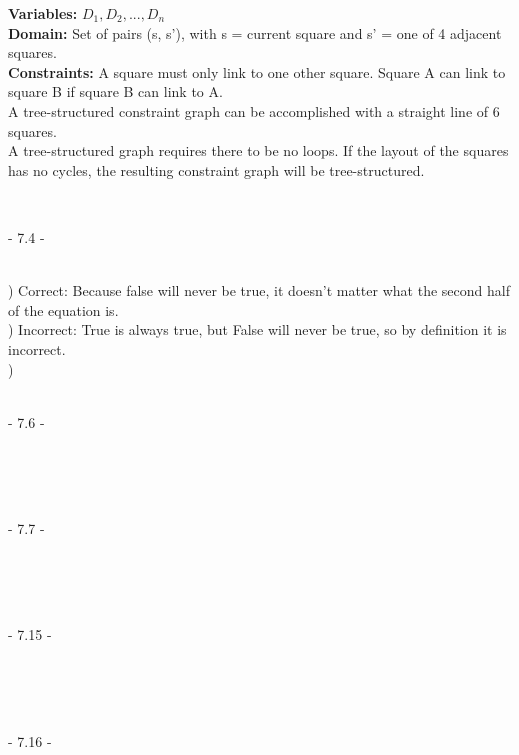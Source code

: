 \documentclass[12pt]{article}
\begin{document}
\noindent \textbf{Variables:} $D_1, D_2, ..., D_n$\\
\textbf{Domain:} Set of pairs (s, s'), with s = current square and s' = one of 4 adjacent squares.\\
\textbf{Constraints:} A square must only link to one other square. Square A can link to square B if square B can link to A. \\

A tree-structured constraint graph can be accomplished with a straight line of 6 squares.\\

A tree-structured graph requires there to be no loops. If the layout of the squares has no cycles, the resulting constraint graph will be tree-structured.

\noindent \hrulefill \\



\centerline{- 7.4 - }
\ \\
) Correct: Because false will never be true, it doesn't matter what the second half of the equation is.\\
) Incorrect: True is always true, but False will never be true, so by definition it is incorrect.\\
) \\



\noindent \hrulefill \\



\centerline{- 7.6 - }
\ \\
\noindent \\


\noindent \hrulefill \\



\centerline{- 7.7 - }
\ \\
\noindent \\


\noindent \hrulefill \\



\centerline{- 7.15 - }
\ \\
\noindent \\


\noindent \hrulefill \\



\centerline{- 7.16 - }
\ \\
\noindent \\


\noindent \hrulefill \\
\end{document}
